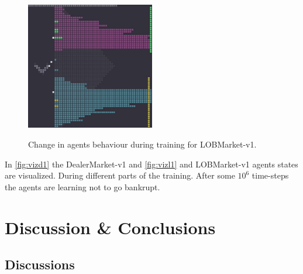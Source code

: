 \documentclass{kththesis}
\theoremstyle{definition}
\begin{document}
\begin{figure}[H]
{\includegraphics[width=0.5\textwidth]{LOBMarket_eps1132_lstm.jpg}
\label{fig:svl4}}
\caption{Change in agents behaviour during training for LOBMarket-v1.}
\label{fig:vizl1}
\end{figure}
In \autoref{fig:vizd1} the DealerMarket-v1 and \autoref{fig:vizl1} and LOBMarket-v1 agents states are visualized. During different parts of the training. After some $10^{6}$ time-steps the agents are learning not to go bankrupt.



\chapter{Discussion \& Conclusions}\label{ch:7}

\section{Discussions}
\end{document}
